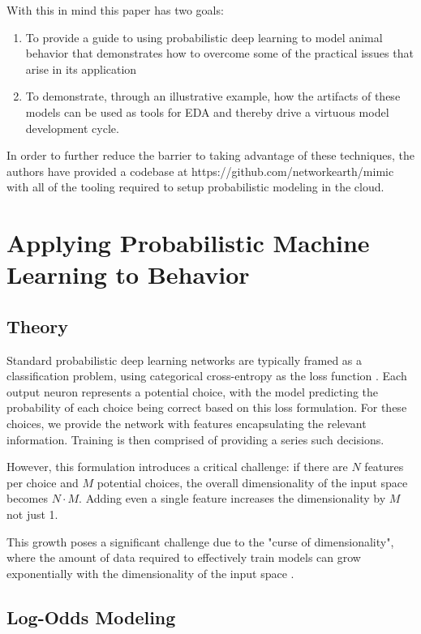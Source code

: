 \documentclass[11pt]{article}
\begin{document}
With this in mind this paper has two goals:

\begin{enumerate}
\item To provide a guide to using probabilistic deep learning to model animal behavior that demonstrates how to overcome some of the practical issues that arise in its application
\item To demonstrate, through an illustrative example, how the artifacts of these models can be used as tools for EDA and thereby drive a virtuous model development cycle.
\end{enumerate} 

In order to further reduce the barrier to taking advantage of these techniques, the authors have provided a codebase at https://github.com/networkearth/mimic with all of the tooling required to setup probabilistic modeling in the cloud. 

\section*{Applying Probabilistic Machine Learning to Behavior}

\subsection*{Theory}

Standard probabilistic deep learning networks are typically framed as a classification problem, using categorical cross-entropy as the loss function \citep{durr}. Each output neuron represents a potential choice, with the model predicting the probability of each choice being correct based on this loss formulation. For these choices, we provide the network with features encapsulating the relevant information. Training is then comprised of providing a series such decisions. 

However, this formulation introduces a critical challenge: if there are $N$ features per choice and $M$ potential choices, the overall dimensionality of the input space becomes $N \cdot M$. Adding even a single feature increases the dimensionality by $M$ not just 1.

This growth poses a significant challenge due to the "curse of dimensionality", where the amount of data required to effectively train models can grow exponentially with the dimensionality of the input space \citep{curse}.

\subsection*{Log-Odds Modeling}
\end{document}
